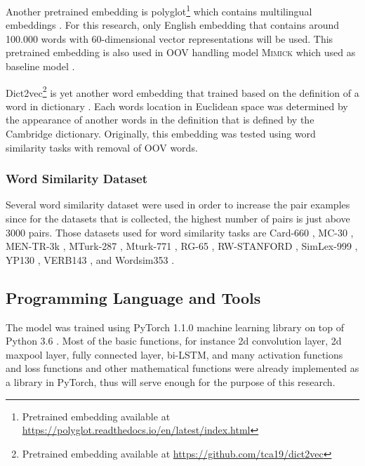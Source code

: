             Another pretrained embedding is
            polyglot\footnote{Pretrained embedding available at
            \url{https://polyglot.readthedocs.io/en/latest/index.html}}
             which contains multilingual embeddings
            \citep{polyglot2013alrfou}. For this research, only
            English embedding that contains around 100.000 words with
            60-dimensional vector representations will be used. This
            pretrained embedding is also used in OOV handling model
            \textsc{Mimick} which used as baseline model
            \citep{mimicking2017Pinter}.

            Dict2vec\footnote{Pretrained embedding available at
            \url{https://github.com/tca19/dict2vec}} is yet another word
            embedding that trained based on the definition of a word in
            dictionary \citep{dict2vect2017tissier}. Each words
            location in Euclidean space was determined by the
            appearance of another words in the definition that is
            defined by the Cambridge dictionary. Originally, this
            embedding was tested using word similarity tasks with
            removal of OOV words.

        \subsubsection{Word Similarity Dataset}
            Several word similarity dataset were used in order to
            increase the pair examples since for the datasets that is
            collected, the highest number of pairs is just above 3000
            pairs. Those datasets used for word similarity tasks are
            Card-660 \citep{card660:pilehvar-etal:2018}, MC-30
            \citep{mc30:strongContextualHypothesis}, MEN-TR-3k
            \citep{mentr3k:bruni-etal-2012-distributional}, MTurk-287
            \citep{mturk287:Radinsky:2011:WTC:1963405.1963455},
            Mturk-771
            \citep{mturk771:Halawi:2012:LLW:2339530.2339751}, RG-65
            \citep{rg65:Rubenstein:1965:CCS:365628.365657},
            RW-STANFORD \citep{rw:luong-etal-2013-better}, SimLex-999
            \citep{simlex999:hill2014}, YP130
            \citep{yp130:inproceedings}, VERB143
            \citep{vp143:baker-etal-2014-unsupervised}, and Wordsim353
            \citep{wordsim353:2002:PSC:503104.503110}.

    \subsection{Programming Language and Tools}
        The model was trained using PyTorch 1.1.0 machine learning
        library on top of Python 3.6 \citep{pytorch2017paszke}. Most
        of the basic functions, for instance 2d convolution layer, 2d
        maxpool layer, fully connected layer, bi-LSTM, and many
        activation functions and loss functions and other mathematical
        functions were already implemented as a library in PyTorch,
        thus will serve enough for the purpose of this research.
            
